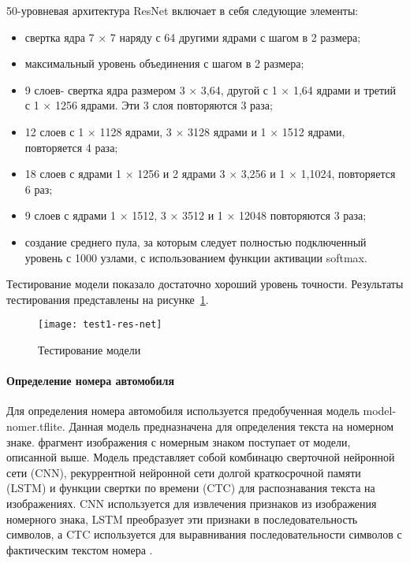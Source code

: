 50-уровневая архитектура ResNet включает в себя следующие элементы:

\begin{itemize}
    \item свертка ядра 7 × 7 наряду с 64 другими ядрами с шагом в 2 размера;
    \item максимальный уровень объединения с шагом в 2 размера;
    \item 9 слоев- свертка ядра размером 3 × 3,64, другой с 1 × 1,64 ядрами и третий с 1 × 1256 ядрами. Эти 3 слоя повторяются 3 раза;
    \item 12 слоев с 1 × 1128 ядрами, 3 × 3128 ядрами и 1 × 1512 ядрами, повторяется 4 раза;
    \item 18 слоев с ядрами 1 × 1256 и 2 ядрами 3 × 3,256 и 1 × 1,1024, повторяется 6 раз;
    \item 9 слоев с ядрами 1 × 1512, 3 × 3512 и 1 × 12048 повторяются 3 раза;
    \item создание среднего пула, за которым следует полностью подключенный уровень с 1000 узлами, с использованием функции активации softmax.
\end{itemize}

Тестирование модели показало достаточно хороший уровень точности. Результаты тестирования представлены на рисунке~\ref{f:test1-res-net}.
\begin{figure}[ht]
	\centering
	\vspace{\toppaddingoffigure}
	\texttt{[image: test1-res-net]}
	\caption{Тестирование модели}
	\label{f:test1-res-net}
\end{figure}


\paragraph{Определение номера автомобиля}

Для определения номера автомобиля используется предобученная модель model-nomer.tflite. Данная модель предназначена для определения текста на номерном знаке. фрагмент изображения с номерным знаком поступает от модели, описанной выше. Модель представляет собой комбинацю сверточной нейронной сети (CNN), рекуррентной нейронной сети долгой краткосрочной памяти (LSTM) и функции свертки по времени (CTC) для распознавания текста на изображениях. CNN используется для извлечения признаков из изображения номерного знака, LSTM преобразует эти признаки в последовательность символов, а CTC используется для выравнивания последовательности символов с фактическим текстом номера .

